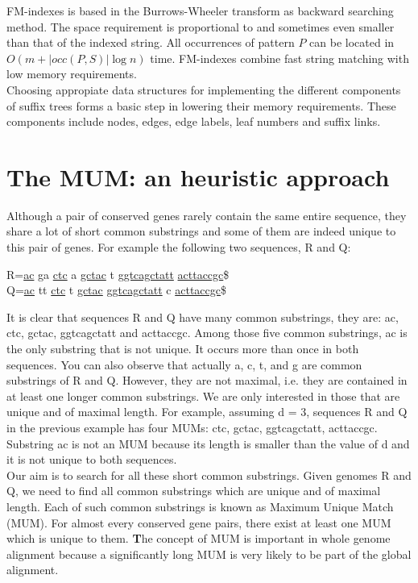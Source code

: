 \documentclass[runningheads,a4paper]{llncs}
\begin{document}
FM-indexes \cite{fm} is based in the Burrows-Wheeler transform \cite{bwt} as backward searching method. The space requirement is proportional to and sometimes even smaller than that of the indexed string. All occurrences of pattern $P$ can be located in $O(m+|occ(P,S)|\log n)$ time. FM-indexes combine fast string matching with low memory requirements.\\
Choosing appropiate data structures for implementing the different components of suffix trees forms a basic step in lowering their memory requirements. These components include nodes, edges, edge labels, leaf numbers and suffix links.
\section{The MUM: an heuristic approach}
Although a pair of conserved genes rarely contain the same entire sequence, they share a lot of short common substrings and some of them are indeed unique to this pair of genes. For example the following two sequences, R and Q:\\
\begin{center}
    R=\underline{ac} ga \underline{ctc} a \underline{gctac} t \underline{ggtcagctatt} \underline{acttaccgc}\$\\
      Q=\underline{ac} tt \underline{ctc} t \underline{gctac} \underline{ggtcagctatt} c \underline{acttaccgc}\$\\
\end{center}
It is clear that sequences R and Q have many common substrings, they are: ac, ctc, gctac, ggtcagctatt and acttaccgc. Among those five common substrings, ac is the only substring that is not unique. It occurs more than once in both sequences. You can also observe that actually a, c, t, and g are common substrings of R and Q. However, they are not maximal, i.e. they are contained in at least one longer common substrings. We are only interested in those that are unique and of maximal length. For example, assuming d = 3, sequences R and Q in the previous example has four MUMs: ctc, gctac, ggtcagctatt, acttaccgc. Substring ac is not an MUM because its length is smaller than the value of d and it is not unique to both sequences.\\
Our aim is to search for all these short common substrings. Given genomes R and Q, we need to find all common substrings which are unique and of maximal length. Each of such common substrings is known as Maximum Unique Match (MUM). For almost every conserved gene pairs, there exist at least one MUM which is unique to them. {\textbf The concept of MUM is important in whole genome alignment because a significantly long MUM is very likely to be part of the global alignment.}
\end{document}
